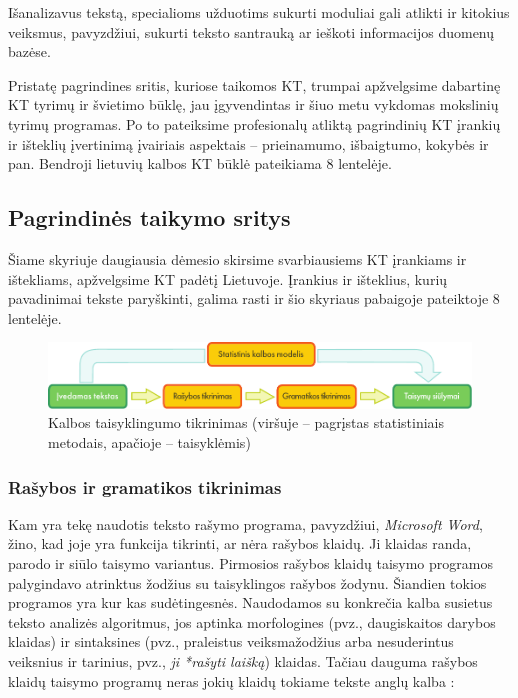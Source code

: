 \begin{multicols}{2}
Išanalizavus tekstą, specialioms užduotims sukurti moduliai gali atlikti ir kitokius veiksmus, pavyzdžiui, sukurti teksto santrauką ar ieškoti informacijos duomenų bazėse.
 
Pristatę pagrindines sritis, kuriose taikomos KT, trumpai apžvelgsime dabartinę KT tyrimų ir švietimo būklę, jau įgyvendintas ir šiuo metu vykdomas mokslinių tyrimų programas. Po to pateiksime profesionalų atliktą pagrindinių KT įrankių ir išteklių įvertinimą įvairiais aspektais – prieinamumo, išbaigtumo, kokybės ir pan. Bendroji lietuvių kalbos KT būklė pateikiama 8 lentelėje.

\subsection{Pagrindinės taikymo sritys} 

Šiame skyriuje daugiausia dėmesio skirsime svarbiausiems KT įrankiams ir ištekliams, apžvelgsime KT padėtį Lietuvoje. Įrankius ir išteklius, kurių pavadinimai tekste paryškinti, galima rasti ir šio skyriaus pabaigoje pateiktoje 8 lentelėje. 

\begin{figure}[htb]
  \center
  \includegraphics[width=\textwidth]{../_media/lithuanian/language_checking}
  \caption{Kalbos taisyklingumo tikrinimas (viršuje – pagrįstas statistiniais metodais, apačioje – taisyklėmis)} %
  \label{fig:langcheckingaarch_de}
\end{figure}

\subsubsection{Rašybos ir gramatikos tikrinimas}

Kam yra tekę naudotis teksto rašymo programa, pavyzdžiui, \textit{Microsoft Word}, žino, kad joje yra funkcija tikrinti, ar nėra rašybos klaidų. Ji klaidas randa, parodo ir siūlo taisymo variantus. Pirmosios rašybos klaidų taisymo programos palygindavo atrinktus žodžius su taisyklingos rašybos žodynu. Šiandien tokios programos yra kur kas sudėtingesnės. Naudodamos su konkrečia kalba susietus teksto analizės algoritmus, jos aptinka morfologines (pvz., daugiskaitos darybos klaidas) ir sintaksines (pvz., praleistus veiksmažodžius arba nesuderintus veiksnius ir tarinius, pvz., \textit{ji *rašyti laišką}) klaidas. Tačiau dauguma rašybos klaidų taisymo programų neras jokių klaidų tokiame tekste anglų kalba \cite{zar1}:


\end{multicols}
